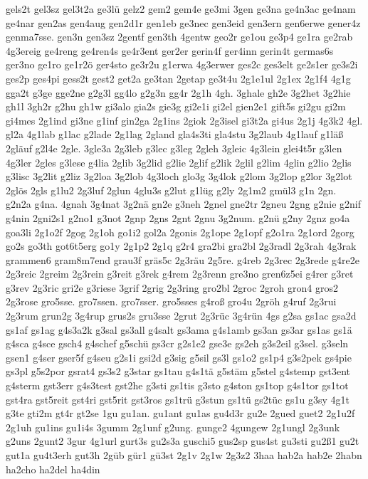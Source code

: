 {gels2t
gel3sz
gel3t2a
ge3lü
gelz2
gem2
gem4e
ge3mi
3gen
ge3na
ge4n3ac
ge4nam
ge4nar
gen2as
gen4aug
gen2d1r
gen1eb
ge3nec
gen3eid
gen3ern
gen6erwe
gener4z
genma7sse.
gen3n
gen3sz
2gentf
gen3th
4gentw
geo2r
ge1ou
ge3p4
ge1ra
ge2rab
4g3ereig
ge4reng
ge4ren4s
ge4r3ent
ger2er
gerin4f
ger4inn
gerin4t
germas6s
ger3no
ge1ro
ge1r2ö
ger4sto
ge3r2u
g1erwa
4g3erwer
ges2c
ges3elt
ge2s1er
ge3s2i
ges2p
ges4pi
gess2t
gest2
get2a
ge3tan
2getap
ge3t4u
2g1e1ul
2g1ex
2g1f4
4g1g
gga2t
g3ge
gge2ne
g2g3l
gg4lo
g2g3n
gg4r
2g1h
4gh.
3ghale
gh2e
3g2het
3g2hie
gh1l
3gh2r
g2hu
gh1w
gi3alo
gia2s
gie3g
gi2e1i
gi2el
gien2e1
gift5s
gi2gu
gi2m
gi4mes
2g1ind
gi3ne
g1inf
gin2ga
2g1ins
2giok
2g3isel
gi3t2a
gi4us
2g1j
4g3k2
4gl.
gl2a
4g1lab
g1lac
g2lade
2g1lag
2gland
gla4s3ti
gla4stu
3g2laub
4g1lauf
g1läß
2gläuf
g2l4e
2gle.
3gle3a
2g3leb
g3lec
g3leg
2gleh
3gleic
4g3lein
glei4t5r
g3len
4g3ler
2gles
g3lese
g4lia
2glib
3g2lid
g2lie
2glif
g2lik
2glil
g2lim
4glin
g2lio
2glis
g3lisc
3g2lit
g2liz
3g2loa
3g2lob
4g3loch
glo3g
3g4lok
g2lom
3g2lop
g2lor
3g2lot
2glös
2gls
g1lu2
2g3luf
2glun
4glu3s
g2lut
g1lüg
g2ly
2g1m2
gmül3
g1n
2gn.
g2n2a
g4na.
4gnah
3g4nat
3g2nä
gn2e
g3neh
2gnel
gne2tr
2gneu
2gng
g2nie
g2nif
g4nin
2gni2s1
g2no1
g3not
2gnp
2gns
2gnt
2gnu
3g2num.
g2nü
g2ny
2gnz
go4a
goa3li
2g1o2f
2gog
2g1oh
go1i2
gol2a
2gonis
2g1ope
2g1opf
g2o1ra
2g1ord
2gorg
go2s
go3th
got6t5erg
go1y
2g1p2
2g1q
g2r4
gra2bi
gra2bl
2g3radl
2g3rah
4g3rak
grammen6
gram8m7end
grau3f
gräs5c
2g3räu
2g5re.
g4reb
2g3rec
2g3rede
g4re2e
2g3reic
2greim
2g3rein
g3reit
g3rek
g4rem
2g3renn
gre3no
gren6z5ei
g4rer
g3ret
g3rev
2g3ric
gri2e
g3riese
3grif
2grig
2g3ring
gro2bl
2groc
2groh
gron4
gros2
2g3rose
gro5sse.
gro7ssen.
gro7sser.
gro5sses
g4roß
gro4u
2gröh
g4ruf
2g3rui
2g3rum
grun2g
3g4rup
grus2s
gru3sse
2grut
2g3rüc
3g4rün
4gs
g2sa
gs1ac
gsa2d
gs1af
gs1ag
g4s3a2k
g3sal
gs3all
g4salt
gs3ama
g4s1amb
gs3an
gs3ar
gs1as
gs1ä
g4sca
g4sce
gsch4
g4schef
g5schü
gs3cr
g2s1e2
gse3e
gs2eh
g3s2eil
g3sel.
g3seln
gsen1
g4ser
gser5f
g4seu
g2s1i
gsi2d
g3sig
g5sil
gs3l
gs1o2
gs1p4
g3s2pek
gs4pie
gs3pl
g5s2por
gsrat4
gs3s2
g3star
gs1tau
g4s1tä
g5stäm
g5stel
g4stemp
gst3ent
g4sterm
gst3err
g4s3test
gst2he
g3sti
gs1tis
g3sto
g4ston
gs1top
g4s1tor
gs1tot
gst4ra
gst5reit
gst4ri
gst5rit
gst3ros
gs1trü
g3stun
gs1tü
gs2tüc
gs1u
g3sy
4g1t
g3te
gti2m
gt4r
gt2se
1gu
gu1an.
gu1ant
gu1as
gu4d3r
gu2e
2gued
guet2
2g1u2f
2g1uh
gu1ins
gu1i4s
3gumm
2g1unf
g2ung.
gunge2
4gungew
2g1ungl
2g3unk
g2uns
2gunt2
3gur
4g1url
gurt3s
gu2s3a
guschi5
gus2sp
gus4st
gu3sti
gu2ß1
gu2t
gut1a
gu4t3erh
gut3h
2güb
gür1
gü3st
2g1v
2g1w
2g3z2
3haa
hab2a
hab2e
2habn
ha2cho
ha2del
ha4din
}
